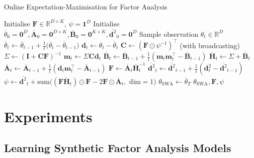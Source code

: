 \documentclass[msc,deptreport.inf]{infthesis} %
\newcommand{\matr}[1]{\mathbf{#1}}
\newcommand{\R}{\mathbb R}
\begin{document}
\begin{algorithm}[!htbp] 
	\caption{Online Expectation-Maximisation for Factor Analysis}
	\label{alg:online_em}
	\begin{algorithmic}[1]
		\State Initialise $\matr{F} \in \R^{D \times K}$, $\psi = \matr{1}^D$
		\State Initialise $\overline{\theta}_0 = \matr{0}^D, \overline{\matr{A}}_0 = \matr{0}^{D \times K}, 
			\overline{\matr{B}}_0 = \matr{0}^{K \times K}, \overline{\matr{d}^2}_0 = \matr{0}^D$
			\State Sample observation $\theta_t \in \R^D$
			\State
				$\overline{\theta}_t \leftarrow  \overline{\theta}_{t-1} + \frac{1}{t}\big(\overline{\theta}_t - \overline{\theta}_{t-1}\big)$
			\State $\matr{d}_t \leftarrow \theta_t - \overline{\theta}_t$
			\State $\matr{C} \leftarrow (\matr{F} \odot \psi^{-1})^\intercal$ (with broadcasting)
			\State $\Sigma \leftarrow (\matr{I} + \matr{C} \matr{F})^{-1}$ 
			\State $\matr{m}_t \leftarrow \Sigma \matr{C} \matr{d}_t$ 
			\State $\overline{\matr{B}}_t \leftarrow \overline{\matr{B}}_{t-1} + \frac{1}{t} (\matr{m}_t \matr{m}_t^\intercal - \overline{\matr{B}}_{t-1})$
			\State $\overline{\matr{H}}_t \leftarrow \Sigma + \overline{\matr{B}}_t$
			\State $\overline{\matr{A}}_t \leftarrow \overline{\matr{A}}_{t-1} + \frac{1}{t} (\matr{d}_t \matr{m}_t^\intercal - \overline{\matr{A}}_{t-1})$
			\State $\matr{F} \leftarrow \overline{\matr{A}}_t \overline{\matr{H}}_t^{-1}$
			\State $\overline{\matr{d}^2}_t \leftarrow \overline{\matr{d}^2}_{t-1} + \frac{1}{t} (\matr{d}_t^2 - \overline{\matr{d}^2}_{t-1})$
			\State $\psi \leftarrow 
				\overline{\matr{d}^2}_t
	+ \text{sum} \big((\matr{F} \overline{\matr{H}}_t) \odot \matr{F} -2\matr{F} \odot \overline{\matr{A}}_t , \text{ dim} = 1\big)$
		\EndFor
		\State $\theta_{\text{SWA}} \leftarrow \overline{\theta}_T$
		\State \Return $\theta_{\text{SWA}}, \matr{F}, \psi$
	\end{algorithmic}
\end{algorithm}


\section{Experiments}

\subsection{Learning Synthetic Factor Analysis Models}\label{ch:online_fa_experiments}
\end{document}
